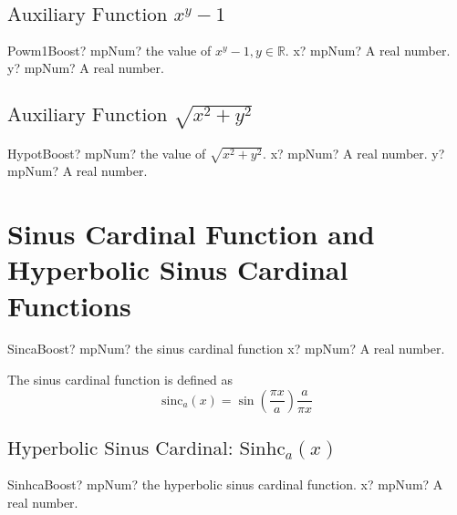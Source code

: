 \subsection{\texorpdfstring{$\text{Auxiliary Function }x^y-1$}{Powm1}}

\begin{mpFunctionsExtract}
	\mpFunctionTwo
	{Powm1Boost? mpNum? the value of $x^y-1, y \in  \mathbb{R}$.}
	{x? mpNum? A real number.}
	{y? mpNum? A real number.}
\end{mpFunctionsExtract}




\subsection{\texorpdfstring{$\text{Auxiliary Function }\sqrt{x^2+y^2}$}{Hypot}}

\begin{mpFunctionsExtract}
	\mpFunctionTwo
	{HypotBoost? mpNum? the value of $\sqrt{x^2+y^2}$.}
	{x? mpNum? A real number.}
	{y? mpNum? A real number.}
\end{mpFunctionsExtract}


\section{Sinus Cardinal Function and Hyperbolic Sinus Cardinal Functions}


\begin{mpFunctionsExtract}
	\mpFunctionOne
	{SincaBoost? mpNum? the sinus cardinal function}
	{x? mpNum? A real number.}
\end{mpFunctionsExtract}

\vspace{0.3cm}
The sinus cardinal function is defined as
\begin{equation}
	\text{sinc}_a(x) = \sin \left( \frac{\pi x}{a} \right) \frac{a}{\pi x}
\end{equation}



\subsection{\texorpdfstring{$\text{Hyperbolic Sinus Cardinal: Sinhc}{}_a(x)$}{Sinhca}}

\begin{mpFunctionsExtract}
	\mpFunctionOne
	{SinhcaBoost? mpNum? the hyperbolic sinus cardinal function.}
	{x? mpNum? A real number.}
\end{mpFunctionsExtract}

